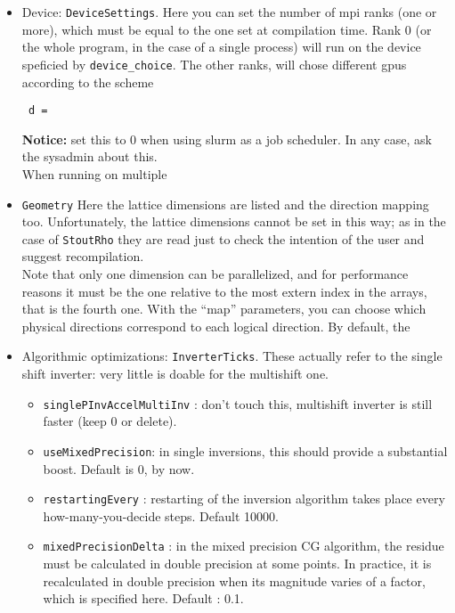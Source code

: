 \begin{itemize}
    
    \item{Device: \verb|DeviceSettings|.}  Here you can set the number of 
mpi ranks (one or more), which must be equal to  the one set at compilation 
time. Rank 0 (or the whole program, in the case of a single process) will run 
on the device speficied by \verb|device_choice|. The other ranks, will chose 
different gpus according to the scheme
\begin{verbatim}
 d = 
\end{verbatim}


\textbf{Notice: } set this to 0 when using slurm as a job scheduler. In any 
case, ask the sysadmin about this.\\
When running on multiple 
    \item{\verb|Geometry|} Here the lattice dimensions are listed and the 
        direction mapping too. Unfortunately, the lattice dimensions cannot be set in 
        this way; as in the case of \verb|StoutRho| they are read just to check the 
        intention of the user and suggest recompilation. \\
        Note that only one dimension can be parallelized, and for performance 
reasons it must be the one relative to the most extern index in the arrays, 
that is the fourth one. With the ``map'' parameters, you can choose which 
physical directions correspond to each logical direction. By default, the 
       
        
        
   \item{Algorithmic optimizations: \verb|InverterTicks|. }
   These actually refer to the single shift inverter: very little is doable for 
the multishift one.
   \begin{itemize}
    \item \verb|singlePInvAccelMultiInv| : don't touch this, multishift 
inverter is still faster (keep 0 or delete).
 \item \verb|useMixedPrecision|: in single inversions, this should provide a 
substantial boost. Default is 0, by now.
 \item \verb|restartingEvery| : restarting of the inversion algorithm takes 
place every how-many-you-decide steps. Default 10000.
 \item \verb|mixedPrecisionDelta| : in the mixed precision CG algorithm, the 
residue must be calculated in double precision at some points. In practice, it 
is recalculated in double precision when its magnitude varies of a factor, 
which is specified here. Default : 0.1.


\end{itemize}
\end{itemize}
